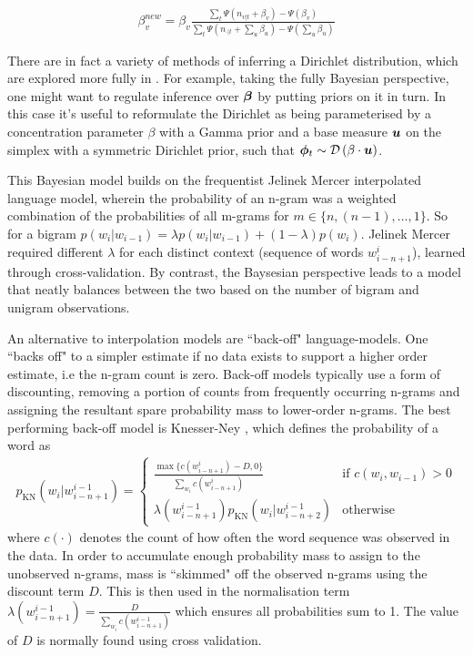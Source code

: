 \begin{align}
\beta^{new}_v = \beta_v \frac{
        \sum_t \Psi(n_{v|t} + \beta_v) - \Psi(\beta_v)
    }{
        \sum_t \Psi(n_{\cdot|t} + \sum_u \beta_u) - \Psi(\sum_u \beta_u)
    }
\end{align}


There are in fact a variety of methods of inferring a Dirichlet distribution, which are explored more fully in \cite{Minka2000}. For example, taking the fully Bayesian perspective, one might want to regulate inference over $\bm \beta$ by putting priors on it in turn. In this case it's useful to reformulate the Dirichlet as being parameterised by a concentration parameter $\beta$ with a Gamma prior and a base measure $\bm u$ on the simplex with a symmetric Dirichlet prior, such that $\bm \phi_t  \sim \mathcal{D} \left( {\beta \cdot \bm u} \right)$.


This Bayesian model builds on the frequentist Jelinek Mercer\cite{JelinekMercer1980} interpolated language model, wherein the probability of an n-gram was a weighted combination of the probabilities of all m-grams for $m \in \{n, (n-1), \ldots, 1\}$. So for a bigram $p(w_i|w_{i-1}) = \lambda p(w_i|w_{i-1}) + (1 - \lambda) p(w_i)$. Jelinek Mercer required different $\lambda$ for each distinct context (sequence of words $w^i_{i-n+1}$), learned through cross-validation. By contrast, the Baysesian perspective leads to a model that neatly balances between the two based on the number of bigram and unigram observations.

An alternative to interpolation models are ``back-off" language-models. One ``backs off" to a simpler estimate if no data exists to support a higher order estimate, i.e the n-gram count is zero. Back-off models typically use a form of discounting, removing a portion of counts from frequently occurring n-grams and assigning the resultant spare probability mass to lower-order n-grams. The best performing back-off model is Knesser-Ney \cite{Chen1999} , which defines the probability of a word as 
\begin{align}
p_\text{KN}(w_i | w^{i-1}_{i-n+1}) = \left\{ \begin{array}{lr}
     \frac{\max\{c(w^i_{i-n+1}) - D, 0\}}{\sum_{w_i} c(w^i_{i-n+1})} & \text{if } c(w_i, w_{i-1}) > 0 \\
     \lambda(w^{i-1}_{i-n+1}) p_\text{KN}(w_i | w^{i-1}_{i-n+2}) & \text{otherwise}
 \end{array}
\right.
\end{align}
where $c(\cdot)$ denotes the count of how often the word sequence was observed in the data. In order to accumulate enough probability mass to assign to the unobserved n-grams, mass is ``skimmed" off the observed n-grams using the discount term $D$. This is then used in the normalisation term $\lambda(w^{i-1}_{i-n+1}) = \frac{D}{\sum_{w_i} c(w^{i-1}_{i-n+1})}$ which ensures all probabilities sum to 1. The value of $D$ is normally found using cross validation.

